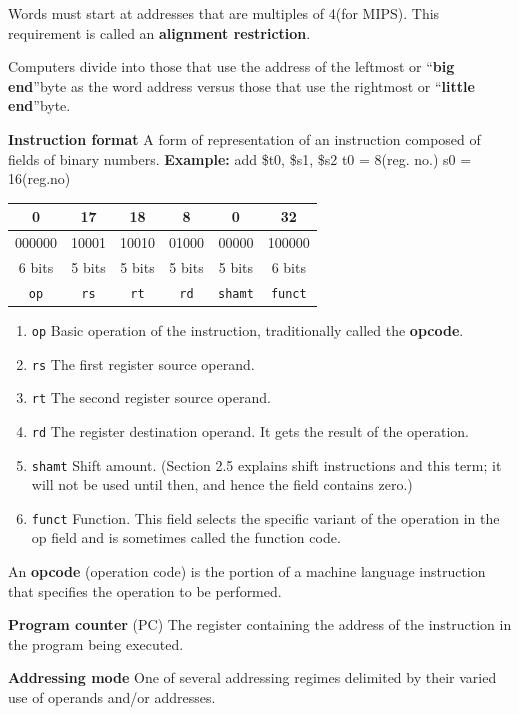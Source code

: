\documentclass[a4paper,oneside]{book}
\begin{document}
\begin{definition}[Offset]
\end{definition}
\begin{definition}
Words must start at addresses that are multiples of 4(for MIPS). This requirement is called an \textbf{alignment restriction}.
\end{definition}
\begin{definition}
Computers divide into those that use the address of the leftmost or \textquotedblleft\textbf{big end}\textquotedblright byte as the word address versus those that use the rightmost or \textquotedblleft\textbf{little end}\textquotedblright byte.
\end{definition}
\begin{definition}
\textbf{Instruction format} A form of representation of an instruction composed of fields of binary numbers.
\textbf{Example: } add \$t0, \$s1, \$s2
t0 = 8(reg. no.) s0 = 16(reg.no)\\
\begin{tabular}[H]{|c|c|c|c|c|c|}
\hline
0 & 17 & 18 & 8 & 0 & 32 \\ \hline
000000 & 10001 & 10010 & 01000 & 00000 & 100000 \\ \hline
6 bits & 5 bits & 5 bits & 5 bits & 5 bits & 6 bits \\ \hline
\texttt{op} & \texttt{rs} & \texttt{rt} & \texttt{rd} & \texttt{shamt} & \texttt{funct} \\ \hline 
\end{tabular}
\begin{enumerate}
\item \texttt{op} Basic operation of the instruction, traditionally called the \textbf{opcode}.
\item \texttt{rs} The first register source operand.
\item \texttt{rt} The second register source operand.
\item \texttt{rd} The register destination operand. It gets the result of the operation.
\item \texttt{shamt} Shift amount. (Section 2.5 explains shift instructions and this term;
it will not be used until then, and hence the field contains zero.)
\item \texttt{funct}  Function. This field selects the specific variant of the operation in the
op field and is sometimes called the function code.
\end{enumerate}
\end{definition}
\begin{definition}[Opcode]
An \textbf{opcode} (operation code) is the portion of a machine language instruction that specifies the operation to be performed.
\end{definition}
\begin{definition}
\textbf{Program counter} (PC) The register containing the address of the instruction in the program being executed.
\end{definition}
\begin{definition}
\textbf{Addressing mode} One of several addressing regimes delimited by their varied use of operands and/or addresses.
\end{definition}
\end{document}
